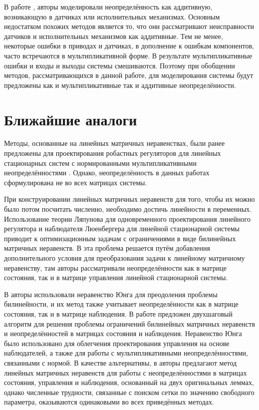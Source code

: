 В работе \cite{Mabrouk2023}, авторы моделировали неопределённость как аддитивную, возникающую в датчиках или исполнительных механизмах. Основным недостатком похожих методов является то, что они рассматривают неисправности датчиков и исполнительных механизмов как аддитивные. Тем не менее, некоторые ошибки в приводах и датчиках, в дополнение к ошибкам компонентов, часто встречаются в мультипликативной форме. В результате мультипликативные ошибки и входы и выходы системы смешиваются. Поэтому при обобщении методов, рассматривающихся в данной работе, для моделирования системы будут предложены как и мультипликативные так и аддитивные неопределённости.
 
\section{Ближайшие аналоги}\label{sec:ch1/sec6}

Методы, основанные на линейных матричных неравенствах, были ранее предложены для проектирования робастных регуляторов для линейных стационарных систем с нормированными мультипликативными неопределённостями \cite{POLYAK2021,ROTONDO2014}. Однако, неопределённость в данных работах сформулирована не во всех матрицах системы.

При конструировании линейных матричных неравенств для того, чтобы их можно было потом посчитать численно, необходимо достичь линейности в переменных. Использование теории Ляпунова для одновременного проектирования линейного регулятора и наблюдателя Люенбергера для линейной стационарной системы приводит к оптимизационным задачам с ограничениями в виде билинейных матричных неравенств. В \cite{LIEN2004} эта проблема решается путём добавления дополнительного условия для преобразования задачи к линейному матричному неравенству, там авторы рассматривали неопределённости как в матрице состояния, так и в матрице управления линейной стационарной системы. 

В \cite{KHELOUFI2013} авторы использовали неравенство Юнга для преодоления проблемы билинейности, и их метод также учитывает неопределённости как в матрице состояния, так и в матрице наблюдения. В работе \cite{ZEMOUCHE2015} предложен двухшаговый алгоритм для решения проблемы ограничений билинейных матричных неравенств и неопределённостей в матрицах состояния и наблюдения. Неравенство Юнга было использовано для облегчения проектирования управления на основе наблюдателей, а также для работы с мультипликативными неопределённостями, связанными с нормой. В качестве альтернативы, в \cite{GRITLI2021} авторы предлагают метод линейных матричных неравенств для работы с неопределённостями в матрицах состояния, управления и наблюдения, основанный на двух оригинальных леммах, однако численные трудности, связанные с поиском сетки по значению свободного параметра, оказываются одинаковыми во всех приведённых методах.

